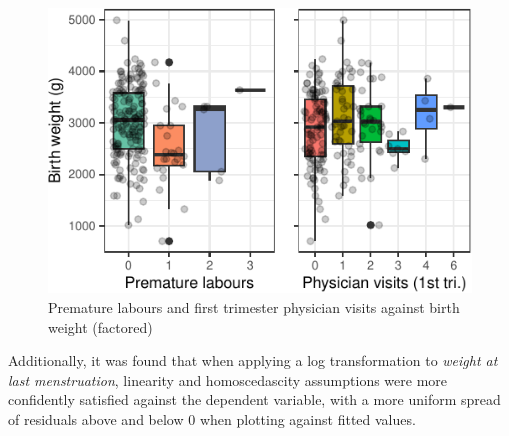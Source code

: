 \documentclass[letterpaper,9pt,twocolumn,twoside,]{pinp}
\begin{document}
\begin{Shaded}
\begin{Highlighting}[]
\SpecialCharTok{$}\SpecialCharTok{\%\textless{}\textgreater{}\%} \NormalTok{()}
\SpecialCharTok{$}\SpecialCharTok{\%\textless{}\textgreater{}\%} \NormalTok{()}
\end{Highlighting}
\end{Shaded}

\begin{figure}

{\centering \includegraphics{Executive-Summary_files/figure-latex/fig1.5-1} 

}

\caption{Premature labours and first trimester physician visits against birth weight (factored)}\label{fig:fig1.5}
\end{figure}

Additionally, it was found that when applying a log transformation to
\emph{weight at last menstruation}, linearity and homoscedascity
assumptions were more confidently satisfied against the dependent
variable, with a more uniform spread of residuals above and below 0 when
plotting against fitted values.

\small

\begin{Shaded}
\begin{Highlighting}[]
\SpecialCharTok{\%\textless{}\textgreater{}\%} 
           \OtherTok{=} 
\end{Highlighting}
\end{Shaded}
\end{document}
